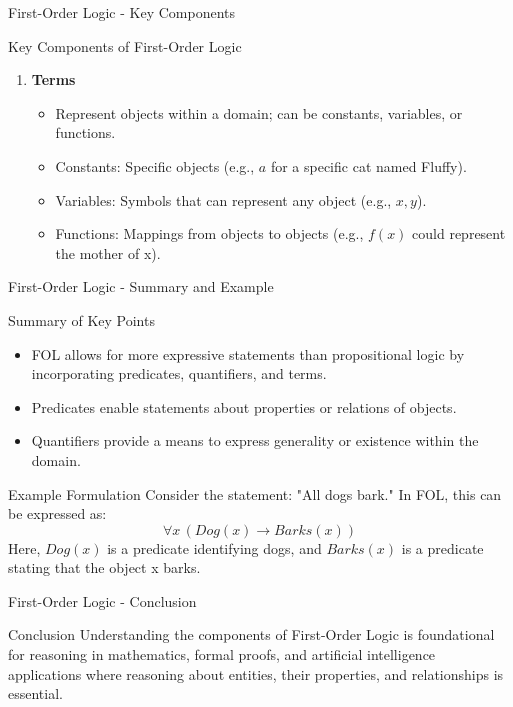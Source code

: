 \documentclass[aspectratio=169]{beamer}
\begin{document}
\begin{frame}[fragile]{First-Order Logic - Key Components}
\begin{block}{Key Components of First-Order Logic}
\begin{enumerate}
            \item \textbf{Terms}
                \begin{itemize}
                    \item Represent objects within a domain; can be constants, variables, or functions.
                    \item Constants: Specific objects (e.g., \( a \) for a specific cat named Fluffy).
                    \item Variables: Symbols that can represent any object (e.g., \( x, y \)).
                    \item Functions: Mappings from objects to objects (e.g., \( f(x) \) could represent the mother of x).
                \end{itemize}
        \end{enumerate}
    \end{block}
\end{frame}

\begin{frame}[fragile]{First-Order Logic - Summary and Example}
    \begin{block}{Summary of Key Points}
        \begin{itemize}
            \item FOL allows for more expressive statements than propositional logic by incorporating predicates, quantifiers, and terms.
            \item Predicates enable statements about properties or relations of objects.
            \item Quantifiers provide a means to express generality or existence within the domain.
        \end{itemize}
    \end{block}

    \begin{block}{Example Formulation}
        Consider the statement: "All dogs bark." 
        In FOL, this can be expressed as:
        \[
        \forall x \, (Dog(x) \rightarrow Barks(x))
        \]
        Here, \( Dog(x) \) is a predicate identifying dogs, and \( Barks(x) \) is a predicate stating that the object x barks.
    \end{block}
\end{frame}

\begin{frame}[fragile]{First-Order Logic - Conclusion}
    \begin{block}{Conclusion}
        Understanding the components of First-Order Logic is foundational for reasoning in mathematics, formal proofs, and artificial intelligence applications 
        where reasoning about entities, their properties, and relationships is essential.
    \end{block}
\end{frame}
\end{document}
